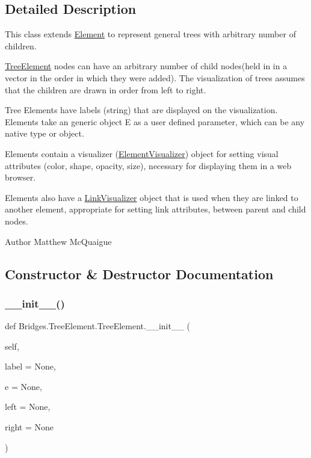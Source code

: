 \subsection{Detailed Description}
This class extends \mbox{\hyperlink{namespace_bridges_1_1_element}{Element}} to represent general trees with arbitrary number of children. 

\mbox{\hyperlink{class_bridges_1_1_tree_element_1_1_tree_element}{Tree\+Element}} nodes can have an arbitrary number of child nodes(held in in a vector in the order in which they were added). The visualization of trees assumes that the children are drawn in order from left to right.

Tree Elements have labels (string) that are displayed on the visualization. Elements take an generic object E as a user defined parameter, which can be any native type or object.

Elements contain a visualizer (\mbox{\hyperlink{namespace_bridges_1_1_element_visualizer}{Element\+Visualizer}}) object for setting visual attributes (color, shape, opacity, size), necessary for displaying them in a web browser.

Elements also have a \mbox{\hyperlink{namespace_bridges_1_1_link_visualizer}{Link\+Visualizer}} object that is used when they are linked to another element, appropriate for setting link attributes, between parent and child nodes.

\begin{DoxyAuthor}{Author}
Matthew Mc\+Quaigue 
\end{DoxyAuthor}


\subsection{Constructor \& Destructor Documentation}
\mbox{\label{class_bridges_1_1_tree_element_1_1_tree_element_a523764e27ed94055175b22574b730046}} 
\subsubsection{\texorpdfstring{\+\_\+\+\_\+init\+\_\+\+\_\+()}{\_\_init\_\_()}}
{\footnotesize\ttfamily def Bridges.\+Tree\+Element.\+Tree\+Element.\+\_\+\+\_\+init\+\_\+\+\_\+ (\begin{DoxyParamCaption}\item[{}]{self,  }\item[{}]{label = {\ttfamily None},  }\item[{}]{e = {\ttfamily None},  }\item[{}]{left = {\ttfamily None},  }\item[{}]{right = {\ttfamily None} }\end{DoxyParamCaption})}



